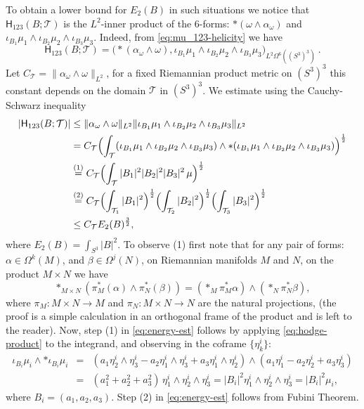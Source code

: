 \documentclass[12pt]{article}
\numberwithin{equation}{section}
\begin{document}
 To obtain a lower bound for $E_2(B)$ in such situations we notice that 
$\mathsf{H}_{123}(B;\mathcal{T})$ is the $L^2$-inner product of the $6$-forms:
$\ast(\omega\wedge\alpha_\omega)$ and $\iota_{B_1}\mu_1\wedge \iota_{B_2}\mu_2\wedge \iota_{B_3}\mu_3$.
Indeed, from \eqref{eq:mu_123-helicity} we have
\[
 \mathsf{H}_{123}(B;\mathcal{T})=\bigl(\ast(\alpha_\omega\wedge \omega),\iota_{B_1}\mu_1\wedge \iota_{B_2}\mu_2\wedge \iota_{B_3}\mu_3\bigr)_{L^2\Omega^6((S^3)^3)}\ .
\]
Let $C_\mathcal{T}=\|\alpha_\omega\wedge \omega\|_{L^2}$, for a fixed Riemannian product metric on $(S^3)^3$ this constant depends on the domain $\mathcal{T}$ in $(S^3)^3$. We estimate using the Cauchy-Schwarz inequality
\begin{equation}\label{eq:energy-est}
\begin{split}
 |\mathsf{H}_{123}(B;\mathcal{T})| & \leq  \|\alpha_\omega\wedge \omega\|_{L^2}\|\iota_{B_1}\mu_1\wedge \iota_{B_2}\mu_2\wedge \iota_{B_3}\mu_3\|_{L^2}\\
 & =  C_\mathcal{T}\Bigl(\int_{\mathcal{T}}(\iota_{B_1}\mu_1\wedge \iota_{B_2}\mu_2\wedge \iota_{B_3}\mu_3)\wedge \ast(\iota_{B_1}\mu_1\wedge \iota_{B_2}\mu_2\wedge \iota_{B_3}\mu_3)\Bigr)^\frac{1}{2}\\
 & \stackrel{(1)}{=}  C_\mathcal{T}\Bigl(\int_{\mathcal{T}}|B_1|^2|B_2|^2|B_3|^2\,\mu\Bigr)^\frac{1}{2}\\
 & \stackrel{(2)}{=} C_\mathcal{T}\Bigl(\int_{\mathcal{T}_1}|B_1|^2\Bigr)^\frac{1}{2}\Bigl(\int_{\mathcal{T}_2}|B_2|^2\Bigr)^\frac{1}{2}\Bigl(\int_{\mathcal{T}_3}|B_3|^2\Bigr)^\frac{1}{2}\\
 & \leq    C_\mathcal{T} E_2(B)^\frac{3}{2},
\end{split}
\end{equation}
where $E_2(B)=\int_{S^3} |B|^2$.
To observe (1) first note that for any pair of forms: $\alpha\in \Omega^k(M)$, and $\beta\in \Omega^j(N)$, on Riemannian manifolds $M$ and $N$, on the product $M\times N$ we have  \begin{equation}\label{eq:hodge-product}
  \ast_{M\times N}(\pi^\ast_M(\alpha)\wedge \pi^\ast_N(\beta))=(\ast_M \pi^\ast_M \alpha)\wedge (\ast_N \pi^\ast_N \beta),
 \end{equation}
where $\pi_M:M\times N\longrightarrow M$ and $\pi_N:M\times N\longrightarrow N$ are the natural projections, (the proof is a simple calculation in an orthogonal frame of the product and is left to the reader).
Now, step (1) in \eqref{eq:energy-est} follows by applying \eqref{eq:hodge-product} to the integrand, and observing in the coframe $\{\eta^i_k\}$:
\begin{eqnarray*}
 \iota_{B_i}\mu_i\wedge \ast \iota_{B_i}\mu_i & = & (a_1\eta^i_2\wedge\eta^i_3-a_2\eta^i_1\wedge\eta^i_3+a_3\eta^i_1\wedge\eta^i_2)\wedge (a_1\eta^i_1-a_2\eta^i_2+a_3\eta^i_3)\\
 & = & (a^2_1+a^2_2+a^2_3)\, \eta^i_1\wedge\eta^i_2\wedge\eta^i_3 = |B_i |^2 \eta^i_1\wedge\eta^i_2\wedge\eta^i_3=|B_i |^2 \mu_i,
\end{eqnarray*}
where  $B_i=(a_1,a_2,a_3)$. Step (2) in \eqref{eq:energy-est} follows from Fubini Theorem.
\end{document}

